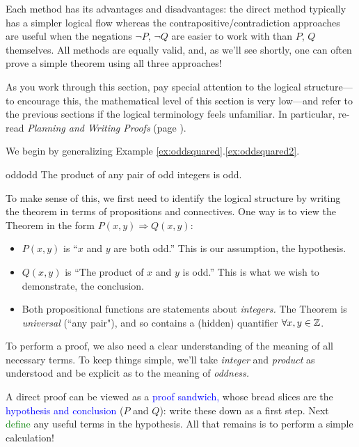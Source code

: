 Each method has its advantages and disadvantages: the direct method typically has a simpler logical flow whereas the contrapositive/contradiction approaches are useful when the negations $\neg P$, $\neg Q$ are easier to work with than $P$, $Q$ themselves. All methods are equally valid, and, as we'll see shortly, one can often prove a simple theorem using all three approaches!\smallbreak

As you work through this section, pay special attention to the logical structure---to encourage this, the mathematical level of this section is very low---and refer to the previous sections if the logical terminology feels unfamiliar. In particular, re-read \emph{Planning and Writing Proofs} (page \pageref{sec:proofplan}).


We begin by generalizing Example \ref*{ex:oddsquared}.\ref{ex:oddsquared2}.

\begin{thm}{}{oddodd}
	The product of any pair of odd integers is odd.
\end{thm}

To make sense of this, we first need to identify the logical structure by writing the theorem in terms of propositions and connectives. One way is to view the Theorem in the form $P(x,y)\Longrightarrow Q(x,y)$:
\begin{itemize}
  \item $P(x,y)$ is ``$x$ and $y$ are both odd.'' This is our assumption, the hypothesis.
  \item $Q(x,y)$ is ``The product of $x$ and $y$ is odd.'' This is what we wish to demonstrate, the conclusion.
  \item Both propositional functions are statements about \emph{integers.} The Theorem is \emph{universal} (``any pair"), and so contains a (hidden) quantifier $\forall x,y\in\mathbb{Z}$.
\end{itemize}
To perform a proof, we also need a clear understanding of the meaning of all necessary terms. To keep things simple, we'll take \emph{integer} and \emph{product} as understood and be explicit as to the meaning of \emph{oddness.}\goodbreak


A direct proof can be viewed as a \textcolor{blue}{proof sandwich,} whose bread slices are the \textcolor{blue}{hypothesis and conclusion} ($P$ and $Q$): write these down as a first step. Next \textcolor{Green}{define} any useful terms in the hypothesis. All that remains is to perform a simple calculation!


